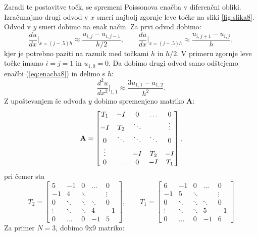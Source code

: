 \documentclass[12pt,a4paper]{article}
\begin{document}
\noindent Zaradi te postavitve točk, se spremeni Poissonova enačba v diferenčni obliki. Izračunajmo drugi odvod v $x$ smeri najbolj zgornje leve točke na sliki \ref{fig:slika8}. Odvod v $y$ smeri dobimo na enak način. Za prvi odvod dobimo:
\begin{equation} \label{eq:enacba8}
\frac{d u}{dx} \biggr|_{x=(j-.5)h} \approx \frac{u_{i,j} - u_{i,j-1}}{h/2}, \qquad \frac{d u}{dx} \biggr|_{x=(j-.5)h} \approx \frac{u_{i,j+1} - u_{i,j}}{h},
\end{equation}
kjer je potrebno paziti na razmik med točkami $h$ in $h/2$. V primeru zgornje leve točke imamo $i=j=1$ in $u_{1,0}=0$.
Da dobimo drugi odvod samo odštejemo enačbi (\ref{eq:enacba8}) in delimo s $h$:
\begin{equation}
\frac{d^{2} u}{d x^{2}} \biggr|_{1,1}  \approx \frac{3u_{1,1} - u_{1,2}}{h^{2}}.
\end{equation}
Z upoštevanjem še odvoda $y$ dobimo spremenjeno matriko \textbf{A}:
\begin{equation}
\textbf{\textrm {A}} = \begin{bmatrix}
T_1 & -I & 0 & \hdots & 0 \\
-I & T_2 & \ddots &  & \vdots \\
0 & \ddots & \ddots & \ddots & 0\\
\vdots &  & -I & T_2 &-I \\
0 & \hdots & 0 & -I & T_1
\end{bmatrix},
\end{equation}
pri čemer sta
\begin{equation*}
T_2= \begin{bmatrix}
5 & -1 & 0 & \hdots & 0 \\
 -1 & 4 & \ddots &  & \vdots  \\
 0 &  \ddots & \ddots &  \ddots & 0 \\
\vdots & \ddots & \ddots &  4 &-1\\
0 & \hdots &  0 &-1   &5
\end{bmatrix}
, \qquad T_1= \begin{bmatrix}
6 & -1 & 0 & \hdots & 0 \\
 -1 & 5 & \ddots &  & \vdots  \\
 0 &  \ddots & \ddots &  \ddots & 0 \\
\vdots & \ddots & \ddots &  5 &-1\\
0 & \hdots &  0 &-1   &6
\end{bmatrix}
\end{equation*}
Za primer $N=3$, dobimo 9x9 matriko:
\end{document}
